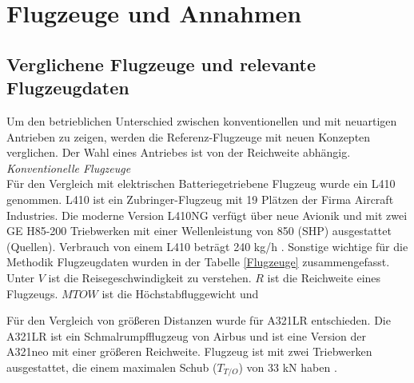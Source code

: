 \section{Flugzeuge und Annahmen}
\subsection{Verglichene Flugzeuge und relevante Flugzeugdaten}
\label{ss:Relevante Flugzeugdaten}
%
Um den betrieblichen Unterschied zwischen konventionellen und mit neuartigen Antrieben zu zeigen, werden die Referenz-Flugzeuge mit neuen 
Konzepten verglichen. 
Der Wahl eines Antriebes ist von der Reichweite abhängig.\\
\textit{Konventionelle Flugzeuge}\\
Für den Vergleich mit elektrischen Batteriegetriebene Flugzeug wurde ein L410 genommen. 
L410 ist ein Zubringer-Flugzeug mit 19 Plätzen der Firma Aircraft Industries. 
Die moderne Version L410NG verfügt über neue Avionik und mit zwei GE H85-200 Triebwerken mit einer Wellenleistung von 850 (SHP) ausgestattet (Quellen).
Verbrauch von einem L410 beträgt 240 kg/h \cite{let2016l410}. Sonstige wichtige für die Methodik Flugzeugdaten wurden in der Tabelle \ref{Flugzeuge} zusammengefasst.
Unter $V$ ist die Reisegeschwindigkeit zu verstehen. $R$ ist die Reichweite eines Flugzeugs. $MTOW$ ist die Höchstabfluggewicht und 

Für den Vergleich von größeren Distanzen wurde für A321LR entschieden. 
Die A321LR ist ein Schmalrumpfflugzeug von Airbus und ist eine Version der A321neo mit einer größeren Reichweite.
Flugzeug ist mit zwei Triebwerken ausgestattet, die einem maximalen Schub ($T_{T/O}$) von 33 kN haben \cite{eurocontrol_a321}.

